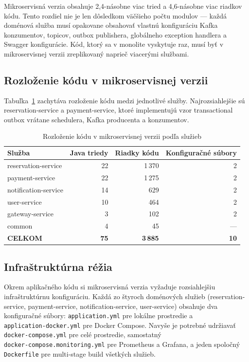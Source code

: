 Mikroservisná verzia obsahuje 2,4-násobne viac tried a 4,6-násobne viac riadkov kódu. Tento rozdiel nie je len dôsledkom väčšieho počtu modulov — každá doménová služba musí opakovane obsahovať vlastnú konfiguráciu Kafka konzumentov, topicov, outbox publishera, globálneho exception handlera a Swagger konfigurácie. Kód, ktorý sa v monolite vyskytuje raz, musí byť v mikroservisnej verzii zreplikovaný naprieč viacerými službami.

\subsection*{Rozloženie kódu v mikroservisnej verzii}

Tabuľka~\ref{tab:micro-per-service} zachytáva rozloženie kódu medzi jednotlivé služby. Najrozsiahlejšie sú reservation-service a payment-service, ktoré implementujú vzor transactional outbox vrátane schedulera, Kafka producenta a konzumentov.

\begin{table}[H]
\centering
\begin{tabular}{|l|r|r|r|}
\hline
\textbf{Služba} & \textbf{Java triedy} & \textbf{Riadky kódu} & \textbf{Konfiguračné súbory} \\ \hline
reservation-service  & 22 & 1\,370 & 2 \\ \hline
payment-service      & 22 & 1\,275 & 2 \\ \hline
notification-service & 14 &   629  & 2 \\ \hline
user-service         & 10 &   464  & 2 \\ \hline
gateway-service      &  3 &   102  & 2 \\ \hline
common               &  4 &    45  & — \\ \hline
\textbf{CELKOM}      & \textbf{75} & \textbf{3\,885} & \textbf{10} \\ \hline
\end{tabular}
\caption{Rozloženie kódu v mikroservisnej verzii podľa služieb}
\label{tab:micro-per-service}
\end{table}

\subsection*{Infraštruktúrna réžia}

Okrem aplikačného kódu si mikroservisná verzia vyžaduje rozsiahlejšiu infraštruktúrnu konfiguráciu. Každá zo štyroch doménových služieb (reservation-service, payment-service, notification-service, user-service) obsahuje dva konfiguračné súbory: \texttt{application.yml} pre lokálne prostredie a \\ \texttt{application-docker.yml} pre Docker Compose. Navyše je potrebné udržiavať \texttt{docker-compose.yml} pre celé prostredie, samostatný \\ \texttt{docker-compose.monitoring.yml} pre Prometheus a Grafana, a jeden spoločný \texttt{Dockerfile} pre multi-stage build všetkých služieb.

